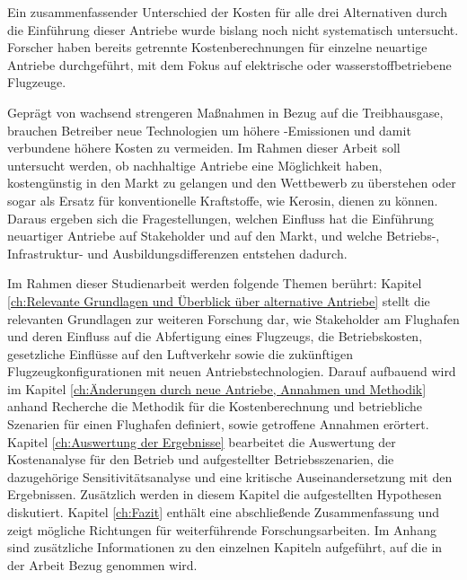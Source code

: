 Ein zusammenfassender Unterschied der Kosten für alle drei Alternativen durch die Einführung dieser Antriebe 
wurde bislang noch nicht systematisch untersucht. 
Forscher haben bereits getrennte Kostenberechnungen für einzelne neuartige Antriebe durchgeführt, mit dem Fokus auf
elektrische oder wasserstoffbetriebene Flugzeuge. 

Geprägt von wachsend strengeren Maßnahmen in Bezug auf die Treibhausgase, brauchen Betreiber neue Technologien um
höhere -Emissionen und damit verbundene höhere Kosten zu vermeiden.
Im Rahmen dieser Arbeit soll untersucht werden, ob nachhaltige Antriebe eine Möglichkeit haben, 
kostengünstig in den Markt zu gelangen und den Wettbewerb zu überstehen oder 
sogar als Ersatz für konventionelle Kraftstoffe, wie Kerosin, dienen zu können. 
Daraus ergeben sich die Fragestellungen, welchen Einfluss hat die Einführung neuartiger Antriebe 
auf Stakeholder und auf den Markt, und welche Betriebs-, Infrastruktur- und Ausbildungsdifferenzen entstehen dadurch.

Im Rahmen dieser Studienarbeit werden folgende Themen berührt:
Kapitel \ref{ch:Relevante Grundlagen und Überblick über alternative Antriebe} stellt 
die relevanten Grundlagen zur weiteren Forschung dar, wie Stakeholder am Flughafen und 
deren Einfluss auf die Abfertigung eines Flugzeugs, die Betriebskosten, 
gesetzliche Einflüsse auf den Luftverkehr sowie die zukünftigen Flugzeugkonfigurationen 
mit neuen Antriebstechnologien.
Darauf aufbauend wird im Kapitel \ref{ch:Änderungen durch neue Antriebe, Annahmen und Methodik} 
anhand Recherche die Methodik für die Kostenberechnung und betriebliche Szenarien für einen Flughafen definiert, 
sowie getroffene Annahmen erörtert.
Kapitel \ref{ch:Auswertung der Ergebnisse} bearbeitet die Auswertung der Kostenanalyse 
für den Betrieb und aufgestellter Betriebsszenarien, die dazugehörige Sensitivitätsanalyse und
eine kritische Auseinandersetzung mit den Ergebnissen. 
Zusätzlich werden in diesem Kapitel die aufgestellten Hypothesen diskutiert.
Kapitel \ref{ch:Fazit} enthält eine abschließende Zusammenfassung 
und zeigt mögliche Richtungen für weiterführende Forschungsarbeiten.
Im Anhang sind zusätzliche Informationen zu den einzelnen Kapiteln aufgeführt, 
auf die in der Arbeit Bezug genommen wird.

